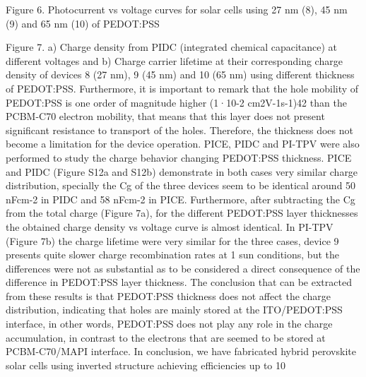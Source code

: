 Figure 6. Photocurrent vs voltage curves for solar cells using 27 nm (8), 45 nm (9) and 65 nm (10) of PEDOT:PSS 


Figure 7. a) Charge density from PIDC (integrated chemical capacitance) at different voltages and b) Charge carrier lifetime at their corresponding charge density of devices 8 (27 nm), 9 (45 nm) and 10 (65 nm) using different thickness of PEDOT:PSS.
Furthermore, it is important to remark that the hole mobility of PEDOT:PSS is one order of magnitude higher (1·10-2 cm2V-1s-1)42 than the PCBM-C70 electron mobility, that means that this layer does not present significant resistance to transport of the holes. 
Therefore, the thickness does not become a limitation for the device operation. PICE, PIDC and PI-TPV were also performed to study the charge behavior changing PEDOT:PSS thickness. PICE and PIDC (Figure S12a and S12b) demonstrate in both cases very similar charge distribution, specially the Cg of the three devices seem to be identical around 50 nFcm-2 in PIDC and 58 nFcm-2 in PICE.
Furthermore, after subtracting the Cg from the total charge (Figure 7a), for the different PEDOT:PSS layer thicknesses the obtained charge density vs voltage curve is almost identical. In PI-TPV (Figure 7b) the charge lifetime were very similar for the three cases, device 9 presents quite slower charge recombination rates at 1 sun conditions, but the differences were not as substantial as to be considered a direct consequence of the difference in PEDOT:PSS layer thickness. The conclusion that can be extracted from these results is that PEDOT:PSS thickness does not affect the charge distribution, indicating that holes are mainly stored at the ITO/PEDOT:PSS interface, in other words, PEDOT:PSS does not play any role in the charge accumulation, in contrast to the electrons that are seemed to be stored at PCBM-C70/MAPI interface.
In conclusion, we have fabricated hybrid perovskite solar cells using inverted structure achieving efficiencies up to 10 %
